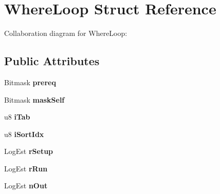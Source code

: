 \hypertarget{struct_where_loop}{\section{Where\+Loop Struct Reference}
\label{struct_where_loop}
}


Collaboration diagram for Where\+Loop\+:
\subsection*{Public Attributes}
\begin{DoxyCompactItemize}
\item 
\hypertarget{struct_where_loop_aa654af6ecff71bd43c4b0cd6046ccf4d}{Bitmask {\bfseries prereq}}\label{struct_where_loop_aa654af6ecff71bd43c4b0cd6046ccf4d}

\item 
\hypertarget{struct_where_loop_a0118b20be771241ee29de452ffead61e}{Bitmask {\bfseries mask\+Self}}\label{struct_where_loop_a0118b20be771241ee29de452ffead61e}

\item 
\hypertarget{struct_where_loop_a469ad31ae7f3b025667813e2d0aa9d01}{u8 {\bfseries i\+Tab}}\label{struct_where_loop_a469ad31ae7f3b025667813e2d0aa9d01}

\item 
\hypertarget{struct_where_loop_a35e725c988b2bcfb9633a259cd6eba58}{u8 {\bfseries i\+Sort\+Idx}}\label{struct_where_loop_a35e725c988b2bcfb9633a259cd6eba58}

\item 
\hypertarget{struct_where_loop_a5e28f2d1299993056255158d33baea33}{Log\+Est {\bfseries r\+Setup}}\label{struct_where_loop_a5e28f2d1299993056255158d33baea33}

\item 
\hypertarget{struct_where_loop_a1a67183b699c90c23940f540486b07d6}{Log\+Est {\bfseries r\+Run}}\label{struct_where_loop_a1a67183b699c90c23940f540486b07d6}

\item 
\hypertarget{struct_where_loop_aaef49d7d8188f3dd94d0c9fd0e727448}{Log\+Est {\bfseries n\+Out}}\label{struct_where_loop_aaef49d7d8188f3dd94d0c9fd0e727448}


\end{DoxyCompactItemize}
